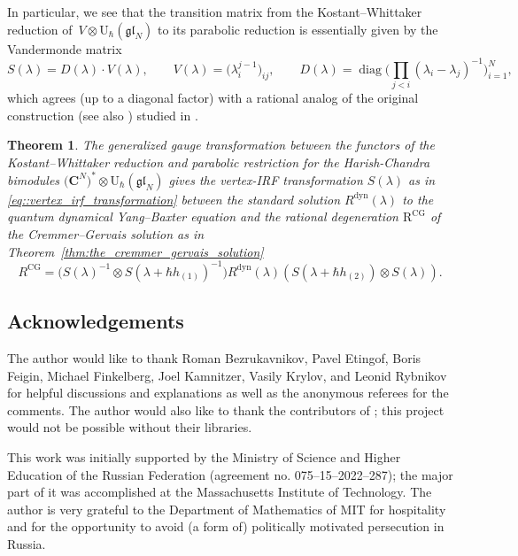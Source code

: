 \documentclass[pdftex]{sigma}
\numberwithin{equation}{section}
\newtheorem{Theorem}{Theorem}[section]
\newcommand{\CG}{\mathrm{CG}}
\newcommand{\C}{\mathbf{C}}
\newcommand{\R}{\mathrm{R}}
\newcommand{\U}{\mathrm{U}_{\hbar}}
\newcommand{\dyn}{\mathrm{dyn}}
\newcommand{\gl}{\mathfrak{gl}}
\begin{document}
	In particular, we see that the transition matrix from the Kostant--Whittaker reduction of~$V \otimes \U(\gl_N)$ to its parabolic reduction is essentially given by the Vandermonde matrix
	\begin{equation}
		\label{eq::vertex_irf_transformation}
		S(\lambda) = D(\lambda) \cdot V(\lambda), \qquad V(\lambda) = \bigl(\lambda_i^{j-1}\bigr)_{ij}, \qquad D(\lambda) = \operatorname{diag}\Big(\prod_{j<i} (\lambda_i-\lambda_j)^{-1} \Big)_{i=1}^N,
	\end{equation}
	which agrees (up to a diagonal factor) with a rational analog of the original construction \cite{CremmerGervais} (see also \cite{BuffenoirRocheTerras}) studied in \cite{BalogDabrowskiFeher}.
	
	\begin{Theorem}
		\label{thm:the_vertex_irf_transformation}
		The generalized gauge transformation between the functors of the Kostant--Whittaker reduction and parabolic restriction for the Harish-Chandra bimodules $\bigl(\C^N\bigr)^* \otimes \U(\gl_N)$ gives the vertex-IRF transformation $S(\lambda)$ as in \eqref{eq::vertex_irf_transformation} between the standard solution $R^{\dyn}(\lambda)$ to the quantum dynamical Yang--Baxter equation and the rational degeneration $\R^{\CG}$ of the Cremmer--Gervais solution as in Theorem~{\rm\ref{thm:the_cremmer_gervais_solution}}
		\[
		R^{\CG} = \bigl(S(\lambda)^{-1} \otimes S(\lambda+\hbar h_{(1)})^{-1} \bigr) R^{\dyn}(\lambda) (S(\lambda+\hbar h_{(2)}) \otimes S(\lambda)).
		\]
	\end{Theorem}
	
\subsection*{Acknowledgements} The author would like to thank Roman Bezrukavnikov, Pavel Etingof, Boris Feigin, Michael Finkelberg, Joel Kamnitzer, Vasily Krylov, and Leonid Rybnikov for helpful discussions and explanations as well as the anonymous referees for the comments. The author would also like to thank the contributors of \cite{SageMath}; this project would not be possible without their libraries.
	
This work was initially supported by the Ministry of Science and Higher Education of the Russian Federation (agreement no. 075–15–2022–287); the major part of it was accomplished at the Massachusetts Institute of Technology. The author is very grateful to the Department of Mathematics of MIT for hospitality and for the opportunity to avoid (a form of) politically motivated persecution in Russia.
	
\end{document}
